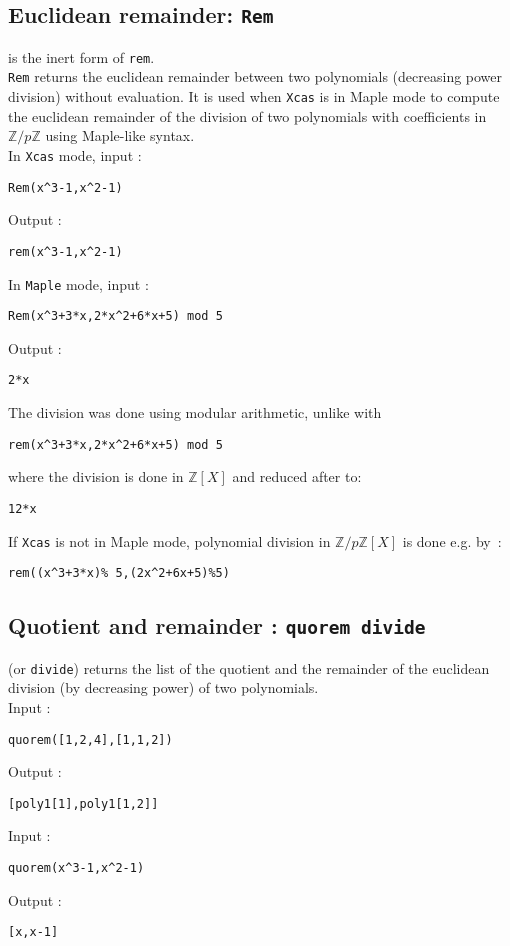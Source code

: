 \documentclass[a4paper,11pt]{book}
\newcommand{\Z}{{\mathbb{Z}}}
\begin{document}
\subsection{Euclidean remainder: {\tt Rem}}
  is the inert form of {\tt rem}.\\
{\tt Rem} returns the euclidean remainder between two polynomials
(decreasing power division) without evaluation. 
It is used when {\tt Xcas} is in Maple mode to compute
the euclidean remainder of the division of two
polynomials with coefficients in $\Z/p\Z$ using Maple-like syntax.\\
In {\tt Xcas}  mode, input :
\begin{center}{\tt Rem(x\verb|^|3-1,x\verb|^|2-1)}\end{center}
Output :
\begin{center}{\tt rem(x\verb|^|3-1,x\verb|^|2-1)}\end{center}
In {\tt Maple}  mode, input  :
\begin{center}{\tt Rem(x\verb|^|3+3*x,2*x\verb|^|2+6*x+5) mod 5}\end{center}
Output :
\begin{center}{\tt 2*x}\end{center}
The division was done using modular arithmetic, unlike with
\begin{center}{\tt rem(x\verb|^|3+3*x,2*x\verb|^|2+6*x+5) mod 5}\end{center}
where the division is done in $\Z[X]$ and reduced after to:
\begin{center}{\tt 12*x}\end{center}
If {\tt Xcas} is not in Maple mode, polynomial division 
in $\Z/p\Z[X]$ is done e.g. by~:
\begin{center}\verb|rem((x^3+3*x)% 5,(2x^2+6x+5)%5)|
\end{center}

\subsection{Quotient and remainder : {\tt quorem divide}}\label{sec:quorem} 
 (or {\tt divide}) returns the list of the quotient and 
the remainder of the euclidean division (by decreasing power) of two
polynomials.\\
Input :
\begin{center}{\tt quorem([1,2,4],[1,1,2]) }\end{center}
Output :
\begin{center}{\tt [poly1[1],poly1[1,2]]}\end{center}
Input :
\begin{center}{\tt quorem(x\verb|^|3-1,x\verb|^|2-1)}\end{center}
Output :
\begin{center}{\tt [x,x-1]}\end{center}
\end{document}
